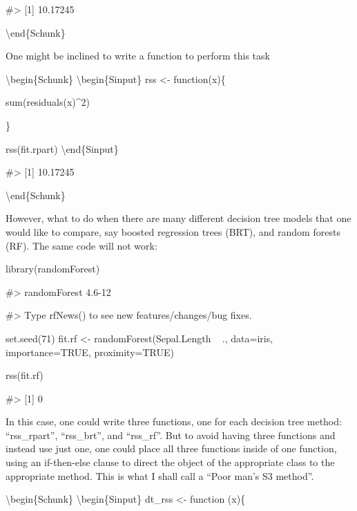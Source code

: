 \begin{Soutput}
#> [1] 10.17245
\end{Soutput}

\textbackslash{}end\{Schunk\}

One might be inclined to write a function to perform this task

\textbackslash{}begin\{Schunk\} \textbackslash{}begin\{Sinput\} rss
\textless{}- function(x)\{

sum(residuals(x)\^{}2)

\}

rss(fit.rpart) \textbackslash{}end\{Sinput\}

\begin{Soutput}
#> [1] 10.17245
\end{Soutput}

\textbackslash{}end\{Schunk\}

However, what to do when there are many different decision tree models
that one would like to compare, say boosted regression trees (BRT), and
random forests (RF). The same code will not work:

\begin{Schunk}
\begin{Sinput}
library(randomForest)
\end{Sinput}
\begin{Soutput}
#> randomForest 4.6-12
\end{Soutput}
\begin{Soutput}
#> Type rfNews() to see new features/changes/bug fixes.
\end{Soutput}
\begin{Sinput}
set.seed(71)
fit.rf <- randomForest(Sepal.Length ~ ., data=iris, importance=TRUE,
                        proximity=TRUE)

rss(fit.rf)
\end{Sinput}
\begin{Soutput}
#> [1] 0
\end{Soutput}
\end{Schunk}

In this case, one could write three functions, one for each decision
tree method: ``rss\_rpart'', ``rss\_brt'', and ``rss\_rf''. But to avoid
having three functions and instead use just one, one could place all
three functions inside of one function, using an if-then-else clause to
direct the object of the appropriate class to the appropriate method.
This is what I shall call a ``Poor man's S3 method''.

\textbackslash{}begin\{Schunk\} \textbackslash{}begin\{Sinput\} dt\_rss
\textless{}- function (x)\{

